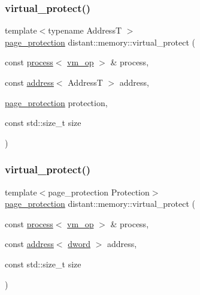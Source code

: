 \mbox{\label{namespacedistant_1_1memory_a68ad702e80d06667f99122f69c2dcbad}} 
\subsubsection{\texorpdfstring{virtual\+\_\+protect()}{virtual\_protect()}\hspace{0.1cm}{\footnotesize\ttfamily [1/4]}}
{\footnotesize\ttfamily template$<$typename AddressT $>$ \\
\mbox{\hyperlink{structdistant_1_1access__rights_a09c6caea8f570f8e2d18c3ef2e2a7804}{page\+\_\+protection}} distant\+::memory\+::virtual\+\_\+protect (\begin{DoxyParamCaption}\item[{const \mbox{\hyperlink{classdistant_1_1kernel__objects_1_1process}{process}}$<$ \mbox{\hyperlink{namespacedistant_af02d4223cd2f509cc373ac9d83655f19}{vm\+\_\+op}} $>$ \&}]{process,  }\item[{const \mbox{\hyperlink{classdistant_1_1memory_1_1address}{address}}$<$ AddressT $>$}]{address,  }\item[{\mbox{\hyperlink{structdistant_1_1access__rights_a09c6caea8f570f8e2d18c3ef2e2a7804}{page\+\_\+protection}}}]{protection,  }\item[{const std\+::size\+\_\+t}]{size }\end{DoxyParamCaption})}

\mbox{\label{namespacedistant_1_1memory_a3544f90cd68f7f91601b0f84f04c6000}} 
\subsubsection{\texorpdfstring{virtual\+\_\+protect()}{virtual\_protect()}\hspace{0.1cm}{\footnotesize\ttfamily [2/4]}}
{\footnotesize\ttfamily template$<$page\+\_\+protection Protection$>$ \\
\mbox{\hyperlink{structdistant_1_1access__rights_a09c6caea8f570f8e2d18c3ef2e2a7804}{page\+\_\+protection}} distant\+::memory\+::virtual\+\_\+protect (\begin{DoxyParamCaption}\item[{const \mbox{\hyperlink{classdistant_1_1kernel__objects_1_1process}{process}}$<$ \mbox{\hyperlink{namespacedistant_af02d4223cd2f509cc373ac9d83655f19}{vm\+\_\+op}} $>$ \&}]{process,  }\item[{const \mbox{\hyperlink{classdistant_1_1memory_1_1address}{address}}$<$ \mbox{\hyperlink{namespacedistant_a9fa41a5a1a17dcbd24da1c1855c92489}{dword}} $>$}]{address,  }\item[{const std\+::size\+\_\+t}]{size }\end{DoxyParamCaption})}

